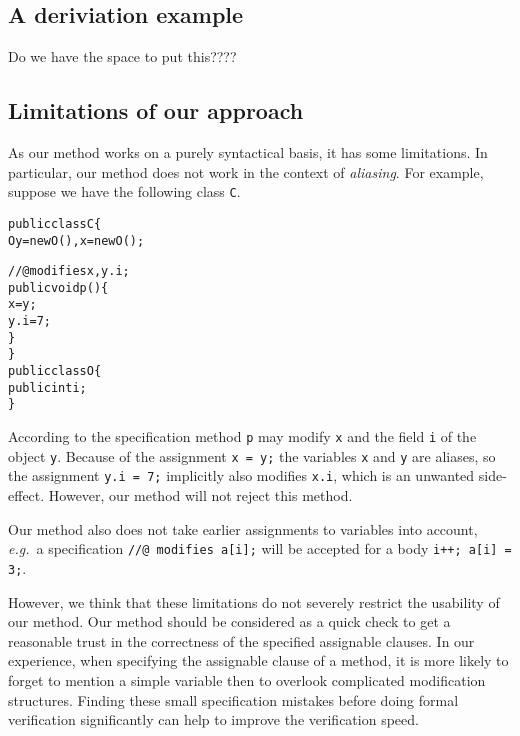 \documentclass[a4paper]{llncs}
\begin{document}
\subsection{A deriviation example}
Do we have the space to put this????


\subsection{Limitations of our approach}
As our method works on a purely syntactical basis, it has some
limitations. In particular, our method does not work in the context of 
\emph{aliasing}. For example, suppose we have the following class
\texttt{C}.

\begin{alltt}
public class C\verb!{!
  O y = new O(), x = new O();    

  //@ modifies x, y.i;
  public void p()\verb!{!
     x = y;
     y.i = 7;
  \verb!}!    
\verb!}!
public class O\verb!{!
  public int i;
\verb!}!
\end{alltt}
According to the specification method \texttt{p} may modify
\texttt{x} and the field \texttt{i} of the object \texttt{y}. Because
of the assignment \texttt{x = y;} the variables \texttt{x} and
\texttt{y} are aliases, so the assignment \texttt{y.i = 7;} implicitly 
also modifies \texttt{x.i}, which is an unwanted side-effect. However, 
our method will not reject this method.


Our method also does not take earlier assignments to variables into
account, \emph{e.g.}~a specification \texttt{//@ modifies a[i];} will 
be accepted for a body \texttt{i++; a[i] = 3;}.

However, we think that these limitations do not severely restrict the
usability of our method. Our method should be considered as a quick
check to get a reasonable trust in the correctness of the specified
assignable clauses. In our experience, when specifying the assignable
clause of a method, it is more likely to forget to mention a simple
variable then to overlook complicated modification structures. Finding 
these small specification mistakes before doing formal verification
significantly can help to improve the verification speed.
\end{document}
